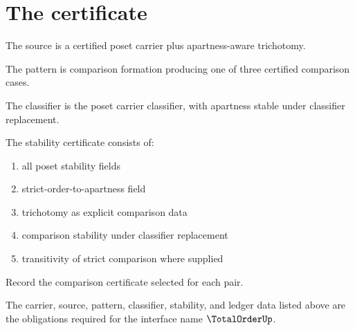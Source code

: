 \section{The certificate}

\begin{definition}
\label{def:totalorder-source-specification}
The source is a certified poset carrier plus apartness-aware trichotomy.
\end{definition}

\begin{definition}
\label{def:totalorder-pattern-specification}
The pattern is comparison formation producing one of three certified comparison cases.
\end{definition}

\begin{definition}
\label{def:totalorder-classifier-specification}
The classifier is the poset carrier classifier, with apartness stable under classifier replacement.
\end{definition}

\begin{definition}
\label{def:totalorder-stability-certificate}
The stability certificate consists of:
\begin{enumerate}
  \item all poset stability fields
  \item strict-order-to-apartness field
  \item trichotomy as explicit comparison data
  \item comparison stability under classifier replacement
  \item transitivity of strict comparison where supplied
\end{enumerate}
\end{definition}

\begin{definition}
\label{def:totalorder-ledger-policy}
Record the comparison certificate selected for each pair.
\end{definition}

\begin{definition}
\label{def:totalorder-certificate-obligations}
The carrier, source, pattern, classifier, stability, and ledger data listed above are the obligations required for the interface name \(\TotalOrderUp\).
\end{definition}

